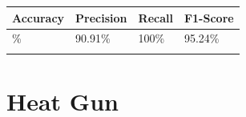 
{\def\LTcaptype{none} %
\begin{longtable}[]{@{}llll@{}}
\toprule\noalign{}
\textbf{Accuracy} & \textbf{Precision} & \textbf{Recall} &
\textbf{F1-Score} \\
\midrule\noalign{}
\endhead
95\% & 90.91\% & 100\% & 95.24\% \\
\bottomrule\noalign{}
\end{longtable}
}

\section{Heat Gun}\label{appendix-e.10.-arc-fault-test-result-for-heat-gun}


